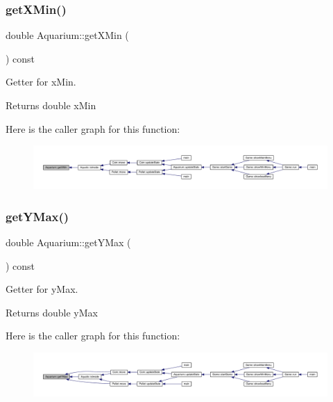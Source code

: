 \subsubsection{\texorpdfstring{get\+X\+Min()}{getXMin()}}
{\footnotesize\ttfamily double Aquarium\+::get\+X\+Min (\begin{DoxyParamCaption}{ }\end{DoxyParamCaption}) const}



Getter for x\+Min. 

\begin{DoxyReturn}{Returns}
double x\+Min 
\end{DoxyReturn}
Here is the caller graph for this function\+:
\nopagebreak
\begin{figure}[H]
\begin{center}
\leavevmode
\includegraphics[width=350pt]{class_aquarium_a3e9e4b1bc86a90a8654bcc76e20e25f1_icgraph}
\end{center}
\end{figure}
\mbox{\label{class_aquarium_a13893ca5240c99792040a7a64fd80bf5}} 
\subsubsection{\texorpdfstring{get\+Y\+Max()}{getYMax()}}
{\footnotesize\ttfamily double Aquarium\+::get\+Y\+Max (\begin{DoxyParamCaption}{ }\end{DoxyParamCaption}) const}



Getter for y\+Max. 

\begin{DoxyReturn}{Returns}
double y\+Max 
\end{DoxyReturn}
Here is the caller graph for this function\+:
\nopagebreak
\begin{figure}[H]
\begin{center}
\leavevmode
\includegraphics[width=350pt]{class_aquarium_a13893ca5240c99792040a7a64fd80bf5_icgraph}
\end{center}
\end{figure}
\mbox{\label{class_aquarium_ad5ef328047a3a0815b32764f7114fbea}} 
